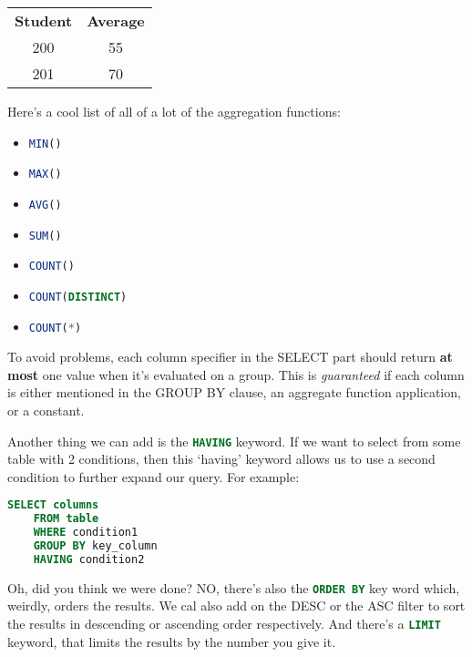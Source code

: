 \documentclass[11pt,a4paper,titlepage,dvipsnames,cmyk]{scrartcl}
\begin{document}
\begin{center}
    \begin{tabular}{|c|c|}
        \hline
        \textbf{Student} & \textbf{Average} \\ \hhline{|=|=|}
        200 & 55 \\ \hline
        201 & 70 \\ \hline
    \end{tabular}
\end{center}

Here's a cool list of all of a lot of the aggregation functions:

\begin{itemize}
    \item \lstinline[language=SQL]|MIN()| 
    \item \lstinline[language=SQL]|MAX()| 
    \item \lstinline[language=SQL]|AVG()| 
    \item \lstinline[language=SQL]|SUM()| 
    \item \lstinline[language=SQL]|COUNT()| 
    \item \lstinline[language=SQL]|COUNT(DISTINCT)| 
    \item \lstinline[language=SQL]|COUNT(*)| 
\end{itemize}

To avoid problems, each column specifier in the SELECT part should return
\textbf{at most} one value when it's evaluated on a group. This is 
\textit{guaranteed} if each column is either mentioned in the GROUP BY
clause, an aggregate function application, or a constant.

Another thing we can add is the \lstinline[language=SQL]|HAVING| keyword.
If we want to select from some table with 2 conditions, then this `having'
keyword allows us to use a second condition to further expand our query.
For example:

\begin{lstlisting}[language=SQL]
SELECT columns
    FROM table
    WHERE condition1
    GROUP BY key_column
    HAVING condition2
\end{lstlisting}

Oh, did you think we were done? NO, there's also the
\lstinline[language=SQL]|ORDER BY| key word which, weirdly, orders the
results. We cal also add on the DESC or the ASC filter to sort the results
in descending or ascending order respectively. And there's a
\lstinline[language=SQL]|LIMIT| keyword, that limits the results by the
number you give it.
\end{document}
